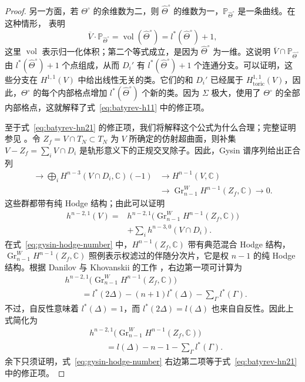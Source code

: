 \begin{proof}
另一方面，若 $\Theta^\circ$ 的余维数为二，则 $\widehat\Theta^\circ$ 的维数为一，$\mathbb P_{\widehat\Theta^\circ}$ 是一条曲线。在这种情形， 表明
\[
\overline V\cdot\mathbb P_{\widehat\Theta^\circ}
=\operatorname{vol}(\widehat\Theta^\circ)
=l^*(\widehat\Theta^\circ)+1,
\]
这里 $\operatorname{vol}$ 表示归一化体积；第二个等式成立，是因为 $\widehat\Theta^\circ$ 为一维。这说明 $\overline V\cap\mathbb P_{\widehat\Theta^\circ}$ 由 $l^*(\widehat\Theta^\circ)+1$ 个点组成，从而 $D_i'$ 有 $l^*(\widehat\Theta^\circ)+1$ 个连通分支。可以证明，这些分支在 $H^{1,1}(V)$ 中给出线性无关的类。它们的和 $D_i'$ 已经属于 $H_{\mathrm{toric}}^{1,1}(V)$，因此，$\Theta^\circ$ 的每个内部格点增加 $l^*(\widehat\Theta^\circ)$ 个新的类。因为 $\Sigma$ 极大，使用了 $\Theta^\circ$ 的全部内部格点，这就解释了式~\eqref{eq:batyrev-h11} 中的修正项。

至于式~\eqref{eq:batyrev-hn21} 的修正项，我们将解释这个公式为什么合理；完整证明参见 。令 $Z_f=V\cap T_N\subset T_N$ 为 $V$ 所确定的仿射超曲面，则补集 $V-Z_f=\sum_i V\cap D_i$ 是轨形意义下的正规交叉除子。因此，Gysin 谱序列给出正合列
\[
\begin{aligned}
\longrightarrow\bigoplus_i H^{n-3}(V\cap D_i,\mathbb C)(-1)
&\longrightarrow H^{n-1}(V,\mathbb C)\\
&\longrightarrow\operatorname{Gr}_{n-1}^W H^{n-1}(Z_f,\mathbb C)
\longrightarrow0.
\end{aligned}
\]
这些群都带有纯 Hodge 结构；由此可以证明
\begin{equation}\label{eq:gysin-hodge-number}
\begin{aligned}
h^{n-2,1}(V)={}&h^{n-2,1}
\bigl(\operatorname{Gr}_{n-1}^W H^{n-1}(Z_f,\mathbb C)\bigr)\\
&+\sum_i h^{n-3,0}(V\cap D_i).
\end{aligned}
\end{equation}
在式~\eqref{eq:gysin-hodge-number} 中，$H^{n-1}(Z_f,\mathbb C)$ 带有典范混合 Hodge 结构，$\operatorname{Gr}_{n-1}^W H^{n-1}(Z_f,\mathbb C)$ 照例表示权滤过的伴随分次片，它是权 $n-1$ 的纯 Hodge 结构。根据 Danilov 与 Khovanskii 的工作 ，右边第一项可计算为
\[
\begin{aligned}
&h^{n-2,1}\bigl(\operatorname{Gr}_{n-1}^W H^{n-1}(Z_f,\mathbb C)\bigr)\\
&\qquad=l^*(2\Delta)-(n+1)l^*(\Delta)-\sum_\Gamma l^*(\Gamma).
\end{aligned}
\]
不过，自反性意味着 $l^*(\Delta)=1$，而 $l^*(2\Delta)=l(\Delta)$ 也来自自反性。因此上式简化为
\[
\begin{aligned}
&h^{n-2,1}\bigl(\operatorname{Gr}_{n-1}^W H^{n-1}(Z_f,\mathbb C)\bigr)\\
&\qquad=l(\Delta)-n-1-\sum_\Gamma l^*(\Gamma).
\end{aligned}
\]
余下只须证明，式~\eqref{eq:gysin-hodge-number} 右边第二项等于式~\eqref{eq:batyrev-hn21} 中的修正项。


\end{proof}
